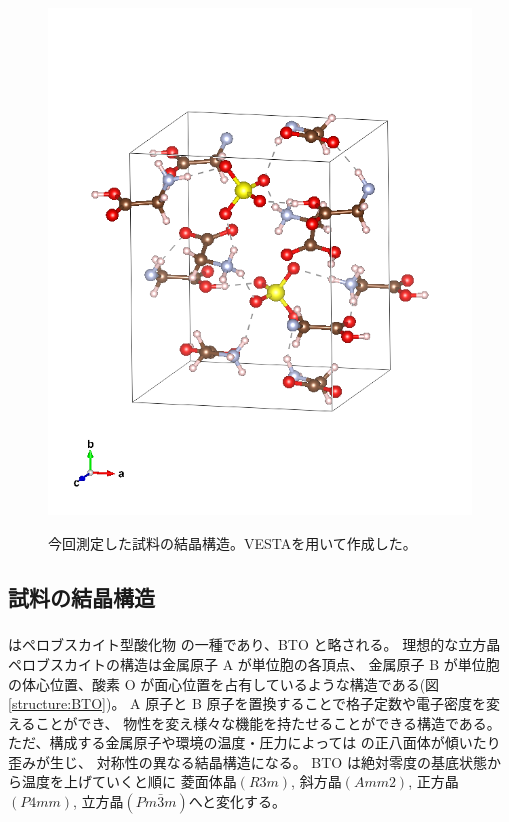 \documentclass[11pt,dvipdfmx,a4paper]{jsarticle}
\begin{document}
\begin{figure}[H]
\begin{minipage}[t]{0.48\columnwidth}
        \includegraphics[width = \columnwidth]{TGS.png}
        \label{structure:TGS}
    \end{minipage}
    \caption{今回測定した試料の結晶構造。VESTA\cite{VESTA}を用いて作成した。}
\end{figure}

\subsection{試料の結晶構造}
\subsubsection*{}
 はペロブスカイト型酸化物  の一種であり、BTO と略される。
理想的な立方晶ペロブスカイトの構造は金属原子 A が単位胞の各頂点、
金属原子 B が単位胞の体心位置、酸素 O が面心位置を占有しているような構造である(図\ref{structure:BTO})。
A 原子と B 原子を置換することで格子定数や電子密度を変えることができ、
物性を変え様々な機能を持たせることができる構造である。
ただ、構成する金属原子や環境の温度・圧力によっては  の正八面体が傾いたり歪みが生じ、
対称性の異なる結晶構造になる。
BTO は絶対零度の基底状態から温度を上げていくと順に
菱面体晶$(R3m)$, 斜方晶$(Amm2)$,
正方晶$(P4mm)$,
立方晶$(Pm\bar{3}m)$へと変化する。
\end{document}
